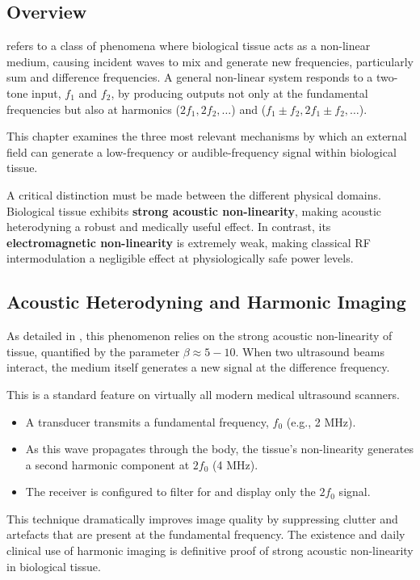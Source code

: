 \subsection{Overview}

 refers to a class of phenomena where biological tissue acts as a non-linear medium, causing incident waves to mix and generate new frequencies, particularly sum and difference frequencies. A general non-linear system responds to a two-tone input, $f_1$ and $f_2$, by producing outputs not only at the fundamental frequencies but also at harmonics ($2f_1, 2f_2, \dots$) and  ($f_1 \pm f_2, 2f_1 \pm f_2, \dots$).

This chapter examines the three most relevant mechanisms by which an external field can generate a low-frequency or audible-frequency signal within biological tissue.

\begin{keyconcept}
    A critical distinction must be made between the different physical domains. Biological tissue exhibits \textbf{strong acoustic non-linearity}, making acoustic heterodyning a robust and medically useful effect. In contrast, its \textbf{electromagnetic non-linearity} is extremely weak, making classical RF intermodulation a negligible effect at physiologically safe power levels.
\end{keyconcept}


\subsection{Acoustic Heterodyning and Harmonic Imaging}

As detailed in , this phenomenon relies on the strong acoustic non-linearity of tissue, quantified by the parameter $\beta \approx 5-10$. When two ultrasound beams interact, the medium itself generates a new signal at the difference frequency.

This is a standard feature on virtually all modern medical ultrasound scanners.
\begin{itemize}
    \item A transducer transmits a fundamental frequency, $f_0$ (e.g., 2 MHz).
    \item As this wave propagates through the body, the tissue's non-linearity generates a second harmonic component at $2f_0$ (4 MHz).
    \item The receiver is configured to filter for and display only the $2f_0$ signal.
\end{itemize}
This technique dramatically improves image quality by suppressing clutter and artefacts that are present at the fundamental frequency. The existence and daily clinical use of harmonic imaging is definitive proof of strong acoustic non-linearity in biological tissue.


